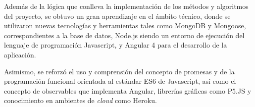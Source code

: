 \documentclass[conference]{IEEEtran}
\begin{document}
Además de la lógica que conlleva la implementación de los métodos y algoritmos del proyecto, se obtuvo un gran aprendizaje en el ámbito técnico, donde se utilizaron nuevas tecnologías y herramientas tales como MongoDB y Mongoose, correspondientes a la base de datos, Node.js siendo un entorno de ejecución del lenguaje de programación Javascript, y Angular 4 para el desarrollo de la aplicación.

Asimismo, se reforzó el uso y comprensión del concepto de promesas y de la programación funcional orientada al estándar ES6 de Javascript, así como el concepto de observables que implementa Angular, librerías gráficas como P5.JS y conocimiento en ambientes de \textit{cloud} como Heroku.

\begin{otherlanguage}{spanish}
\printbibliography %
\end{otherlanguage}
\end{document}
